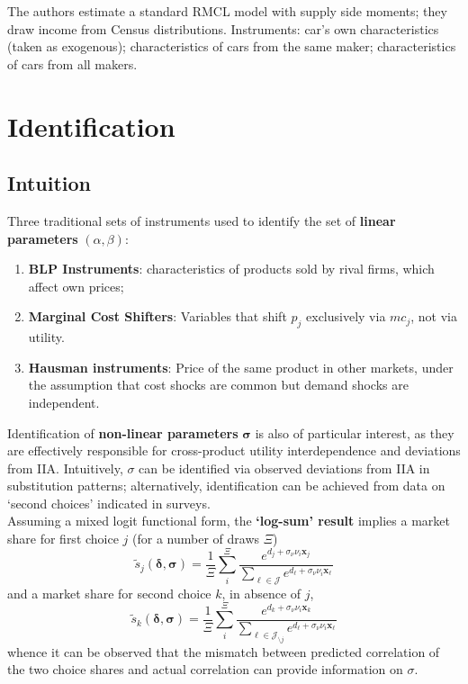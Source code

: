 \documentclass[11pt]{article}
\begin{document}
The authors estimate a standard RMCL model with supply side moments; they draw income from Census distributions. Instruments: car's own characteristics (taken as exogenous); characteristics of cars from the same maker; characteristics of cars from all makers.

\section{Identification}

\subsection{Intuition}

Three traditional sets of instruments used to identify the set of \textbf{linear parameters} $(\alpha, \beta)$:
\begin{enumerate}
	\item \textbf{BLP Instruments}: characteristics of products sold by rival firms, which affect own prices;
	\item \textbf{Marginal Cost Shifters}: Variables that shift $p_j$ exclusively via $mc_j$, not via utility.
	\item \textbf{Hausman instruments}: Price of the same product in other markets, under the assumption that cost shocks are common but demand shocks are independent.
\end{enumerate}

Identification of \textbf{non-linear parameters} $\bm{\sigma}$ is also of particular interest, as they are effectively responsible for cross-product utility interdependence and deviations from IIA.
Intuitively, $\sigma$ can be identified via observed deviations from IIA in substitution patterns; alternatively, identification can be achieved from data on `second choices' indicated in surveys. \\
Assuming a mixed logit functional form, the \textbf{`log-sum' result} implies a market share for first choice $j$ (for a number of draws $\Xi$)
\begin{equation}
	\tilde{s}_j(\bm{\delta, \sigma}) = \frac{1}{\Xi} \sum_i^\Xi \frac{e^{d_j + \sigma_\nu \nu_i \bm{x}_j}}{\sum_{\ell \in \mathscr{J}}e^{d_\ell + \sigma_\nu \nu_i \bm{x}_\ell}}
\end{equation}
and a market share for second choice $k$, in absence of $j$,
\begin{equation}
	\tilde{s}_k(\bm{\delta, \sigma}) = \frac{1}{\Xi} \sum_i^\Xi \frac{e^{d_k + \sigma_\nu \nu_i \bm{x}_k}}{\sum_{\ell \in \mathscr{J}_{ \setminus j}}e^{d_\ell + \sigma_\nu \nu_i \bm{x}_\ell}}
\end{equation}
whence it can be observed that the mismatch between predicted correlation of the two choice shares and actual correlation can provide information on $\sigma$.
\end{document}
